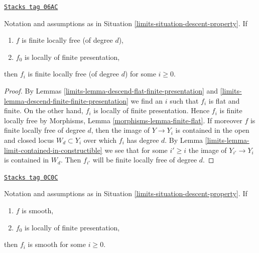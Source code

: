 \begin{lemma}
\label{limits-lemma-descend-finite-locally-free}
\href{https://stacks.math.columbia.edu/tag/06AC}{\texttt{Stacks tag 06AC}}

Notation and assumptions as in Situation \ref{limits-situation-descent-property}.
If
\begin{enumerate}
\item $f$ is finite locally free (of degree $d$),
\item $f_0$ is locally of finite presentation,
\end{enumerate}
then $f_i$ is finite locally free (of degree $d$) for some $i \geq 0$.
\end{lemma}

\begin{proof}

By
Lemmas \ref{limits-lemma-descend-flat-finite-presentation} and
\ref{limits-lemma-descend-finite-finite-presentation}
we find an $i$ such that $f_i$ is flat and finite.
On the other hand, $f_i$ is locally of finite presentation.
Hence $f_i$ is finite locally free by
Morphisms, Lemma \ref{morphisms-lemma-finite-flat}.
If moreover $f$ is finite locally free of degree $d$,
then the image of $Y \to Y_i$ is contained in the
open and closed locus $W_d \subset Y_i$ over which $f_i$ has degree
$d$. By
Lemma \ref{limits-lemma-limit-contained-in-constructible}
we see that for some $i' \geq i$ the image of $Y_{i'} \to Y_i$
is contained in $W_d$.
Then $f_{i'}$ will be finite locally free of degree $d$.
\end{proof}

\begin{lemma}
\label{limits-lemma-descend-smooth}
\href{https://stacks.math.columbia.edu/tag/0C0C}{\texttt{Stacks tag 0C0C}}

Notation and assumptions as in Situation \ref{limits-situation-descent-property}.
If
\begin{enumerate}
\item $f$ is smooth,
\item $f_0$ is locally of finite presentation,
\end{enumerate}
then $f_i$ is smooth for some $i \geq 0$.
\end{lemma}


